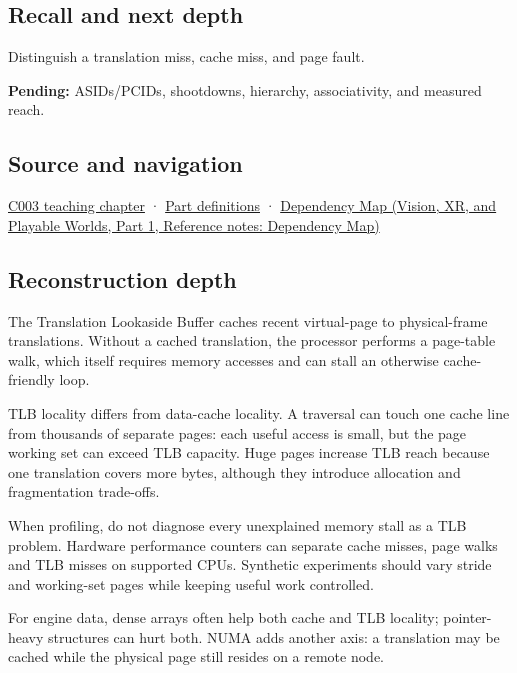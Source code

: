 \subsection{Recall and next depth}\label{appendix-7a2d9c5ce511-recall-and-next-depth}

\hypertarget{appendix-7a2d9c5ce511-recall-and-next-depth}{}

Distinguish a translation miss, cache miss, and page fault.

\textbf{Pending:} ASIDs/PCIDs, shootdowns, hierarchy, associativity, and measured reach.

\subsection{Source and navigation}\label{appendix-7a2d9c5ce511-source-and-navigation}

\hypertarget{appendix-7a2d9c5ce511-source-and-navigation}{}

\hyperref[01-foundations-i-ch002-where-the-bytes-live]{C003 teaching chapter} · \hyperref[appendix-fd090d982a15-m003---parts-41-60]{Part definitions} · \href{../07-Vision-XR-and-Playable-Worlds-P01/main.pdf\#appendix-4ad47bdd269a}{Dependency Map (Vision, XR, and Playable Worlds, Part 1, Reference notes: Dependency Map)}

\subsection{Reconstruction depth}\label{appendix-7a2d9c5ce511-reconstruction-depth}

\hypertarget{appendix-7a2d9c5ce511-reconstruction-depth}{}

The Translation Lookaside Buffer caches recent virtual-page to physical-frame translations. Without a cached translation, the processor performs a page-table walk, which itself requires memory accesses and can stall an otherwise cache-friendly loop.

TLB locality differs from data-cache locality. A traversal can touch one cache line from thousands of separate pages: each useful access is small, but the page working set can exceed TLB capacity. Huge pages increase TLB reach because one translation covers more bytes, although they introduce allocation and fragmentation trade-offs.

When profiling, do not diagnose every unexplained memory stall as a TLB problem. Hardware performance counters can separate cache misses, page walks and TLB misses on supported CPUs. Synthetic experiments should vary stride and working-set pages while keeping useful work controlled.

For engine data, dense arrays often help both cache and TLB locality; pointer-heavy structures can hurt both. NUMA adds another axis: a translation may be cached while the physical page still resides on a remote node.
